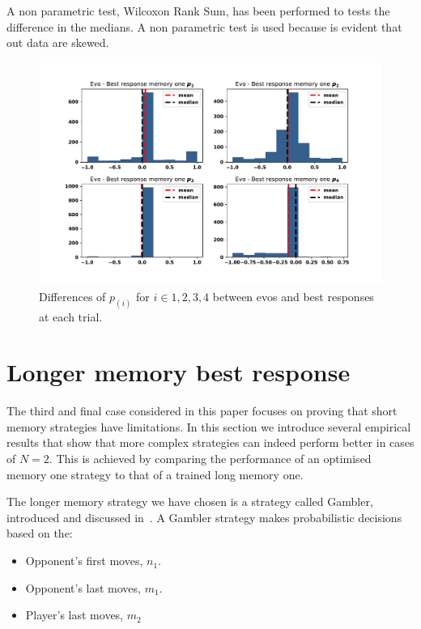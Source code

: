 \documentclass[10pt]{article}
\begin{document}
\begin{table}
    \centering
    \resizebox{.41\columnwidth}{!}{%
    }
    \caption{A non parametric test, Wilcoxon Rank Sum, has been performed to
    tests the difference in the medians. A non parametric test is used because
    is evident that out data are skewed.}\label{table:wilcoxon_tests}
\end{table}

\begin{figure}
    \centering
    \includegraphics[width=.8\textwidth]{img/distances.pdf}
    \caption{Differences of \(p_(i)\) for \(i \in {1, 2, 3, 4}\) between evos and best responses at each trial.}
    \label{fig:distances}
\end{figure}


\section{Longer memory best response}

The third and final case considered in this paper focuses on proving that short memory strategies
have limitations. In this section we introduce several empirical results that
show that more complex strategies can indeed perform better in cases of \(N=2\).
This is achieved by comparing the performance of an optimised memory one strategy
to that of a trained long memory one.

The longer memory strategy we have chosen is a strategy called Gambler,
introduced and discussed in~\cite{Harper2017}. A Gambler strategy makes probabilistic
decisions based on the:

\begin{itemize}
    \item Opponent's first moves, \(n_1\).
    \item Opponent's last moves, \(m_1\).
    \item Player's last moves, \(m_2\)
\end{itemize}
\end{document}

